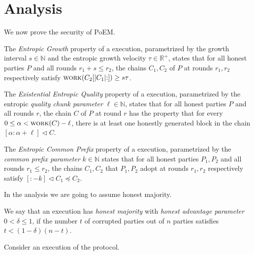 \section{Analysis}

We now prove the security of PoEM.

\begin{definition}
  The \emph{Entropic Growth} property of
  a \poem execution,
  parametrized by the growth interval $s \in \mathbb{N}$
  and the entropic growth velocity $\tau \in \mathbb{R}^+$,
  states that for
  all honest parties $P$ and all rounds $r_1 + s \leq r_2$,
  the chains $C_1, C_2$ of $P$ at rounds $r_1, r_2$ respectively
  satisfy $\textsc{work}(C_2[{|C_1|}{:}]) \geq s \tau$.
\end{definition}

\begin{definition}
  The \emph{Existential Entropic Quality} property of
  a \poem execution, parametrized by the entropic \emph{quality chunk parameter} $\ell \in \mathbb{N}$,
  states that for
  all honest parties $P$ and all rounds $r$,
  the chain $C$ of $P$ at round $r$
  has the property that
  for every $0 \leq \alpha < \textsc{work}(C) - \ell$,
  there is at least one honestly generated block in the chain
  $[{\alpha}{:}{\alpha + \ell}] \lhd C$.
\end{definition}

\begin{definition}
  The \emph{Entropic Common Prefix} property of
  a \poem execution, parametrized by the \emph{common prefix parameter} $k \in \mathbb{N}$
  states that for
  all honest parties $P_1, P_2$
  and all rounds $r_1 \leq r_2$,
  the chains $C_1, C_2$ that $P_1, P_2$ adopt at rounds $r_1, r_2$ respectively
  satisfy $[{:}{-k}] \lhd C_1 \preccurlyeq C_2$.
\end{definition}

In the analysis we are going to assume honest majority.

\begin{definition}
  We say that an execution has \emph{honest majority} with \emph{honest advantage parameter}
  $0 < \delta \leq 1$, if the number $t$ of corrupted parties out of
  $n$ parties satisfies $t < (1 - \delta) (n - t)$.
\end{definition}

Consider an execution of the \poem protocol.

